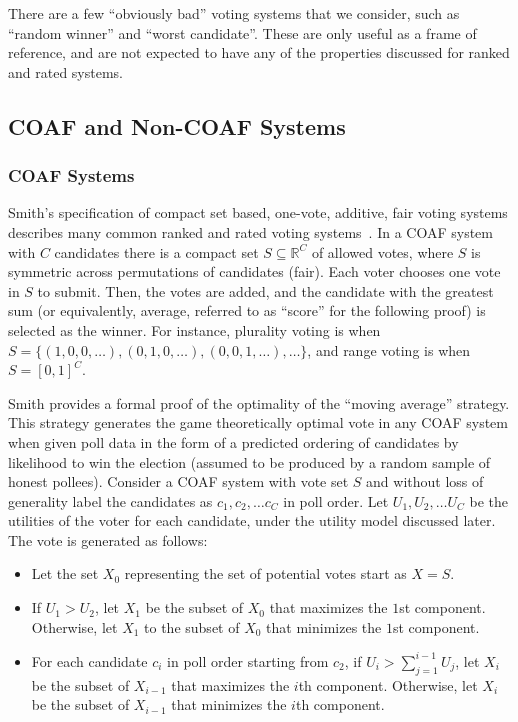 \documentclass[11pt]{article}
\begin{document}
    There are a few ``obviously bad'' voting systems that we consider,
    such as ``random winner'' and ``worst candidate''.
    These are only useful as a frame of reference,
    and are not expected to have any of the properties discussed for ranked and rated systems.

    \subsection{COAF and Non-COAF Systems}\label{subsec:coaf-and-non-coaf-systems}

    \subsubsection{COAF Systems}

    Smith's specification of compact set based, one-vote, additive, fair voting systems
    describes many common ranked and rated voting systems~\cite{Smith}.
    In a COAF system with $C$ candidates there is a compact set $S \subseteq \mathbb{R}^C$ of allowed votes,
    where $S$ is symmetric across permutations of candidates (fair).
    Each voter chooses one vote in $S$ to submit.
    Then, the votes are added, and the candidate with the greatest sum
    (or equivalently, average, referred to as ``score'' for the following proof)
    is selected as the winner.
    For instance, plurality voting is when $S = \{(1, 0, 0, \dots), (0, 1, 0, \dots), (0, 0, 1, \dots), \dots\}$,
    and range voting is when $S = [0, 1]^C$.

    Smith provides a formal proof of the optimality of the ``moving average'' strategy.
    This strategy generates the game theoretically optimal vote in any COAF system
    when given poll data in the form of a predicted ordering of candidates
    by likelihood to win the election
    (assumed to be produced by a random sample of honest pollees).
    Consider a COAF system with vote set $S$
    and without loss of generality label the candidates as $c_1, c_2, \dots c_C$ in poll order.
    Let $U_1, U_2, \dots U_C$ be the utilities of the voter for each candidate,
    under the utility model discussed later.
    The vote is generated as follows:

    \begin{itemize}
        \item Let the set $X_0$ representing the set of potential votes start as $X = S$.
        \item If $U_1 > U_2$, let $X_1$ be the subset of $X_0$ that maximizes the $1$st component.
        Otherwise, let $X_1$ to the subset of $X_0$ that minimizes the $1$st component.
        \item For each candidate $c_i$ in poll order starting from $c_2$,
        if $U_i > \sum_{j = 1}^{i - 1} U_j$, let $X_i$ be the subset of $X_{i - 1}$ that maximizes the $i$th component.
        Otherwise, let $X_i$ be the subset of $X_{i - 1}$ that minimizes the $i$th component.
    \end{itemize}
\end{document}
